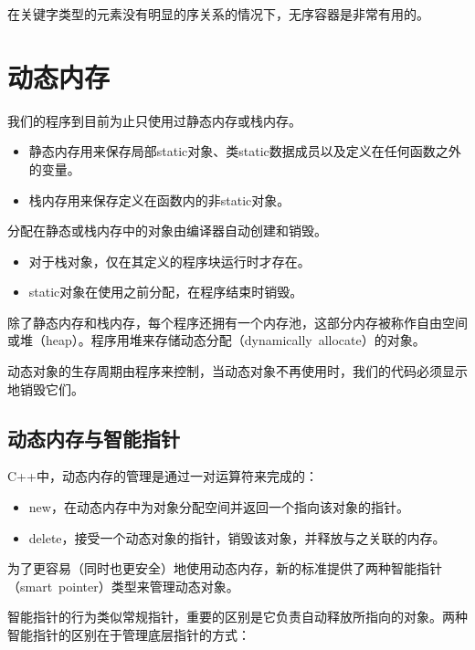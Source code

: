 \documentclass[
  a4paper,
  oneside,tablecaptionabove
]{scrbook}
\begin{document}
在关键字类型的元素没有明显的序关系的情况下，无序容器是非常有用的。

\chapter{动态内存}\label{ux52a8ux6001ux5185ux5b58}

我们的程序到目前为止只使用过静态内存或栈内存。

\begin{itemize}
\item
  静态内存用来保存局部static对象、类static数据成员以及定义在任何函数之外的变量。
\item
  栈内存用来保存定义在函数内的非static对象。
\end{itemize}

分配在静态或栈内存中的对象由编译器自动创建和销毁。

\begin{itemize}
\item
  对于栈对象，仅在其定义的程序块运行时才存在。
\item
  static对象在使用之前分配，在程序结束时销毁。
\end{itemize}

除了静态内存和栈内存，每个程序还拥有一个内存池，这部分内存被称作自由空间或堆（heap）。程序用堆来存储动态分配（dynamically~allocate）的对象。

动态对象的生存周期由程序来控制，当动态对象不再使用时，我们的代码必须显示地销毁它们。

\section{动态内存与智能指针}\label{ux52a8ux6001ux5185ux5b58ux4e0eux667aux80fdux6307ux9488}

C++中，动态内存的管理是通过一对运算符来完成的：

\begin{itemize}
\item
  new，在动态内存中为对象分配空间并返回一个指向该对象的指针。
\item
  delete，接受一个动态对象的指针，销毁该对象，并释放与之关联的内存。
\end{itemize}

为了更容易（同时也更安全）地使用动态内存，新的标准提供了两种智能指针（smart~pointer）类型来管理动态对象。

智能指针的行为类似常规指针，重要的区别是它负责自动释放所指向的对象。两种智能指针的区别在于管理底层指针的方式：
\end{document}
